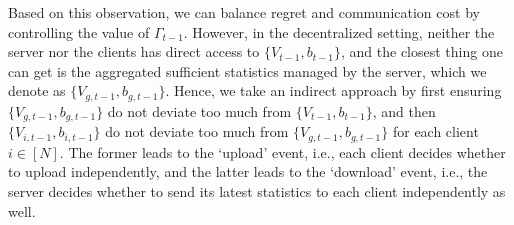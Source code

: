 Based on this observation, we can balance regret and communication cost by controlling the value of $\Gamma_{t-1}$. 
However, in the decentralized setting, neither the server nor the clients has direct access to $\{V_{t-1},b_{t-1}\}$, and the closest thing one can get is the aggregated sufficient statistics managed by the server, which we denote as $\{V_{g,t-1},b_{g,t-1}\}$. Hence, we take an indirect approach by first ensuring $\{V_{g,t-1},b_{g,t-1}\}$ do not deviate too much from $\{V_{t-1},b_{t-1}\}$, and then $\{V_{i,t-1},b_{i,t-1}\}$ do not deviate too much from $\{V_{g,t-1},b_{g,t-1}\}$ for each client $i\in [N]$. The former leads to the `upload' event, i.e., each client decides whether to upload independently, and the latter leads to the `download' event, i.e., the server decides whether to send its latest statistics to each client independently as well. 



